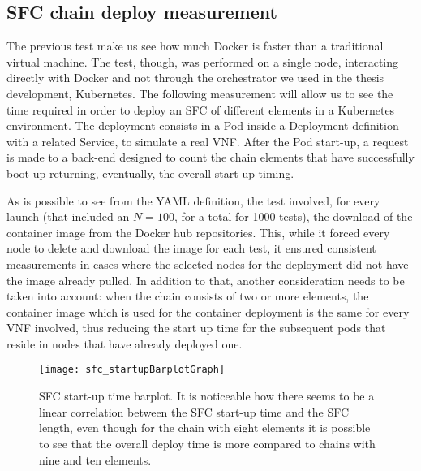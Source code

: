 

\subsection{SFC chain deploy measurement}

The previous test make us see how much Docker is faster than a traditional
virtual machine. The test, though, was performed on a single node, interacting
directly with Docker and not through the orchestrator we used in the thesis
development, Kubernetes. The following measurement will allow us to see the time
required in order to deploy an SFC of different elements in a Kubernetes
environment. The deployment consists in a Pod inside a Deployment definition
with a related Service, to simulate a real VNF. After the Pod start-up, a 
request
is made to a back-end designed to count the chain elements that have 
successfully
boot-up returning, eventually, the overall start up timing.



\vspace{0.5cm}

\noindent As is possible to see from the YAML definition, the test involved, for
every launch (that included an $N = 100$, for a total for 1000 tests), the
download of the container image from the Docker hub repositories. This, while it
forced every node to delete and download the image for each test, it ensured
consistent measurements in cases where the selected nodes for the deployment did
not have the image already pulled. In addition to that, another consideration
needs to be taken into account: when the chain consists of two or more elements,
the container image which is used for the container deployment is the same for
every VNF involved, thus reducing the start up time for the subsequent pods that
reside in nodes that have already deployed one.

\begin{figure}[t]
  \centering
  \texttt{[image: sfc\_startupBarplotGraph]}
  \caption[SFC start-up time barplot]{SFC start-up time barplot. It is
    noticeable how there seems to be a linear correlation between the SFC
    start-up time and the SFC length, even though for the chain with eight
    elements it is possible to see that the overall deploy time is more compared
    to chains with nine and ten elements.}
  \label{chap:tests:sec:sfclength:img:barplot}
\end{figure}

